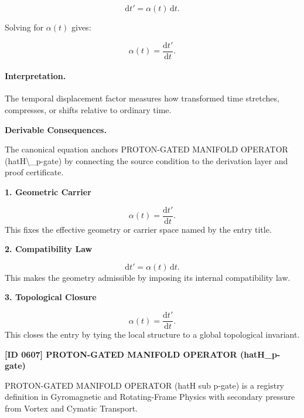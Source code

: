 \begin{equation}
\mathrm{d}t' = \alpha(t)\,\mathrm{d}t .
\end{equation}

Solving for $\alpha(t)$ gives:

\begin{equation}
\boxed{
\alpha(t)=\frac{\mathrm{d}t'}{\mathrm{d}t}.
}
\end{equation}

\paragraph{Interpretation.}
The temporal displacement factor measures how transformed time stretches, compresses, or shifts relative to ordinary time.

\par\vspace{0.35em}
\noindent\textbf{Derivable Consequences.}\quad
\begingroup
\footnotesize
\raggedright
The canonical equation anchors PROTON-GATED MANIFOLD OPERATOR (hatH\textbackslash{}\_p-gate) by connecting the source condition to the derivation layer and proof certificate.
\par\endgroup

\noindent\textbf{1. Geometric Carrier}\par
\[
\alpha(t)=\frac{\mathrm{d}t'}{\mathrm{d}t}.
\]
\noindent This fixes the effective geometry or carrier space named by the entry title.\par
\noindent\textbf{2. Compatibility Law}\par
\[
\mathrm{d}t' = \alpha(t)\,\mathrm{d}t.
\]
\noindent This makes the geometry admissible by imposing its internal compatibility law.\par
\noindent\textbf{3. Topological Closure}\par
\[
\boxed{ \alpha(t)=\frac{\mathrm{d}t'}{\mathrm{d}t}. }
\]
\noindent This closes the entry by tying the local structure to a global topological invariant.\par

\clearpage
\noindent\textbf{[ID 0607] PROTON-GATED MANIFOLD OPERATOR (hatH\_p-gate)}\par
\vspace{0.35em}
\begingroup\small
{}
PROTON-GATED MANIFOLD OPERATOR (hatH sub p-gate) is a registry definition in Gyromagnetic and Rotating-Frame Physics with secondary pressure from Vortex and Cymatic Transport.

